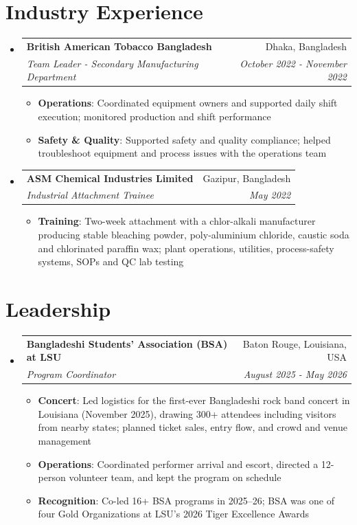 \documentclass[letterpaper,20pt]{article}
\makeatletter
\newcommand{\resumeItem}[2]{
  \item\small{
    \textbf{#1}{: #2 \vspace{-2pt}}
  }
}
\newcommand{\resumeSubheading}[4]{
  \vspace{-1pt}\item
    \begin{tabular*}{0.97\textwidth}{l@{\extracolsep{\fill}}r}
      \textbf{#1} & #2 \\
      \textit{\small#3} & \textit{\small #4} \\
    \end{tabular*}\vspace{-7pt}
}
\newcommand{\resumeSubHeadingListStart}{\begin{itemize}[leftmargin=*]}
\newcommand{\resumeSubHeadingListEnd}{\end{itemize}}
\newcommand{\resumeItemListStart}{\begin{itemize}}
\newcommand{\resumeItemListEnd}{\end{itemize}\vspace{-5pt}}
\makeatother
\begin{document}
\section{Industry Experience}
  \resumeSubHeadingListStart
    \resumeSubheading
      {British American Tobacco Bangladesh}{Dhaka, Bangladesh}
      {Team Leader - Secondary Manufacturing Department}{October 2022 - November 2022}
      \resumeItemListStart
        \resumeItem{Operations}{Coordinated equipment owners and supported daily shift execution; monitored production and shift performance}
        \resumeItem{Safety \& Quality}{Supported safety and quality compliance; helped troubleshoot equipment and process issues with the operations team}
      \resumeItemListEnd

    \resumeSubheading
      {ASM Chemical Industries Limited}{Gazipur, Bangladesh}
      {Industrial Attachment Trainee}{May 2022}
      \resumeItemListStart
        \resumeItem{Training}{Two-week attachment with a chlor-alkali manufacturer producing stable bleaching powder, poly-aluminium chloride, caustic soda and chlorinated paraffin wax; plant operations, utilities, process-safety systems, SOPs and QC lab testing}
      \resumeItemListEnd
  \resumeSubHeadingListEnd

\section{Leadership}
  \resumeSubHeadingListStart
    \resumeSubheading
      {Bangladeshi Students' Association (BSA) at LSU}{Baton Rouge, Louisiana, USA}
      {Program Coordinator}{August 2025 - May 2026}
      \resumeItemListStart
        \resumeItem{Concert}{Led logistics for the first-ever Bangladeshi rock band concert in Louisiana (November 2025), drawing 300+ attendees including visitors from nearby states; planned ticket sales, entry flow, and crowd and venue management}
        \resumeItem{Operations}{Coordinated performer arrival and escort, directed a 12-person volunteer team, and kept the program on schedule}
        \resumeItem{Recognition}{Co-led 16+ BSA programs in 2025--26; BSA was one of four Gold Organizations at LSU's 2026 Tiger Excellence Awards}
      \resumeItemListEnd
  \resumeSubHeadingListEnd

\end{document}
